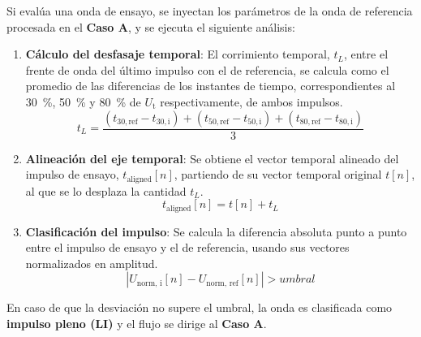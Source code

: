 Si evalúa una onda de ensayo, se inyectan los parámetros de la onda de referencia procesada en el \textbf{Caso A}, y se ejecuta el siguiente análisis:
\begin{enumerate}[resume]
    \item \textbf{Cálculo del desfasaje temporal}: El corrimiento temporal, $t_L$, entre el frente de onda del último impulso con el de referencia, se calcula como el promedio de las diferencias de los instantes de tiempo, correspondientes al \qty{30}{\percent}, \qty{50}{\percent} y \qty{80}{\percent} de $U_\text{t}$ respectivamente, de ambos impulsos.
    \begin{equation}
        t_L = \frac{\left( t_{30, \text{ref}} - t_{30, \text{i}} \right) + \left( t_{50, \text{ref}} - t_{50, \text{i}} \right) + \left( t_{80, \text{ref}} - t_{80, \text{i}} \right)}{3} 
    \end{equation}
    \item \textbf{Alineación del eje temporal}: Se obtiene el vector temporal alineado del impulso de ensayo, $t_\text{aligned}[n]$, partiendo de su vector temporal original $t[n]$, al que se lo desplaza la cantidad $t_L$.
    \begin{equation}
        t_\text{aligned}[n] = t[n] + t_L
        \label{eq:eje_alineado}
    \end{equation}
    \item \textbf{Clasificación del impulso}: Se calcula la diferencia absoluta punto a punto entre el impulso de ensayo y el de referencia, usando sus vectores normalizados en amplitud.
    \begin{equation}
        | U_{\text{norm, i}}[n] - U_{\text{norm, ref}}[n] | > umbral
        \label{eq:umbral_desviacion}
    \end{equation}
\end{enumerate}

En caso de que la desviación no supere el umbral, la onda es clasificada como \textbf{impulso pleno (LI)} y el flujo se dirige al \textbf{Caso A}.

